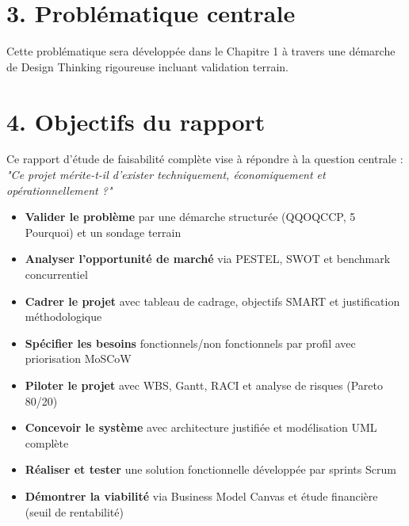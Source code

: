 \documentclass[12pt,a4paper]{report}
\begin{document}
\section*{3. Problématique centrale}

\begin{center}
\end{center}

Cette problématique sera développée dans le Chapitre 1 à travers une démarche de Design Thinking rigoureuse incluant validation terrain.

\section*{4. Objectifs du rapport}

Ce rapport d'étude de faisabilité complète vise à répondre à la question centrale : \textit{"Ce projet mérite-t-il d'exister techniquement, économiquement et opérationnellement ?"}

\begin{itemize}
    \item \textbf{Valider le problème} par une démarche structurée (QQOQCCP, 5 Pourquoi) et un sondage terrain
    \item \textbf{Analyser l'opportunité de marché} via PESTEL, SWOT et benchmark concurrentiel
    \item \textbf{Cadrer le projet} avec tableau de cadrage, objectifs SMART et justification méthodologique
    \item \textbf{Spécifier les besoins} fonctionnels/non fonctionnels par profil avec priorisation MoSCoW
    \item \textbf{Piloter le projet} avec WBS, Gantt, RACI et analyse de risques (Pareto 80/20)
    \item \textbf{Concevoir le système} avec architecture justifiée et modélisation UML complète
    \item \textbf{Réaliser et tester} une solution fonctionnelle développée par sprints Scrum
    \item \textbf{Démontrer la viabilité} via Business Model Canvas et étude financière (seuil de rentabilité)
\end{itemize}
\end{document}
